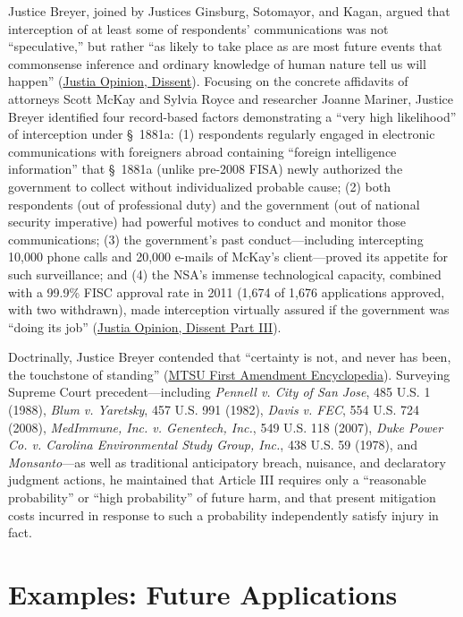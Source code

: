 \documentclass[12pt]{article}
\begin{document}
Justice Breyer, joined by Justices Ginsburg, Sotomayor, and Kagan, argued that interception of at least some of respondents' communications was not ``speculative,'' but rather ``as likely to take place as are most future events that commonsense inference and ordinary knowledge of human nature tell us will happen'' (\href{https://supreme.justia.com/cases/federal/us/568/398/}{Justia Opinion, Dissent}). Focusing on the concrete affidavits of attorneys Scott McKay and Sylvia Royce and researcher Joanne Mariner, Justice Breyer identified four record-based factors demonstrating a ``very high likelihood'' of interception under \S~1881a: (1) respondents regularly engaged in electronic communications with foreigners abroad containing ``foreign intelligence information'' that \S~1881a (unlike pre-2008 FISA) newly authorized the government to collect without individualized probable cause; (2) both respondents (out of professional duty) and the government (out of national security imperative) had powerful motives to conduct and monitor those communications; (3) the government's past conduct---including intercepting 10,000 phone calls and 20,000 e-mails of McKay's client---proved its appetite for such surveillance; and (4) the NSA's immense technological capacity, combined with a 99.9\% FISC approval rate in 2011 (1,674 of 1,676 applications approved, with two withdrawn), made interception virtually assured if the government was ``doing its job'' (\href{https://supreme.justia.com/cases/federal/us/568/398/}{Justia Opinion, Dissent Part III}).

Doctrinally, Justice Breyer contended that ``certainty is not, and never has been, the touchstone of standing'' (\href{https://firstamendment.mtsu.edu/article/clapper-v-amnesty-international/}{MTSU First Amendment Encyclopedia}). Surveying Supreme Court precedent---including \textit{Pennell v. City of San Jose}, 485 U.S. 1 (1988), \textit{Blum v. Yaretsky}, 457 U.S. 991 (1982), \textit{Davis v. FEC}, 554 U.S. 724 (2008), \textit{MedImmune, Inc. v. Genentech, Inc.}, 549 U.S. 118 (2007), \textit{Duke Power Co. v. Carolina Environmental Study Group, Inc.}, 438 U.S. 59 (1978), and \textit{Monsanto}---as well as traditional anticipatory breach, nuisance, and declaratory judgment actions, he maintained that Article III requires only a ``reasonable probability'' or ``high probability'' of future harm, and that present mitigation costs incurred in response to such a probability independently satisfy injury in fact.

\section{Examples: Future Applications}
\end{document}
